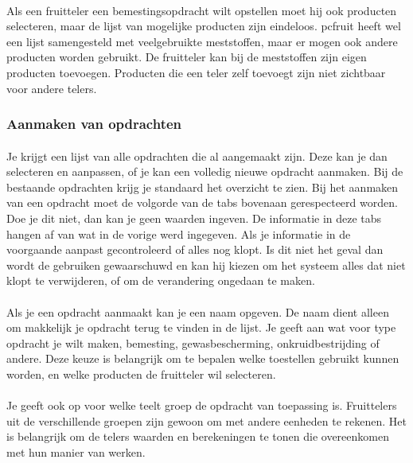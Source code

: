 \paragraph {} Als een fruitteler een bemestingsopdracht wilt opstellen moet hij ook
producten selecteren, maar de lijst van mogelijke producten zijn eindeloos. pcfruit heeft
wel een lijst samengesteld met veelgebruikte meststoffen, maar er mogen ook andere
producten worden gebruikt. De fruitteler kan bij de meststoffen zijn eigen producten
toevoegen. Producten die een teler zelf toevoegt zijn niet zichtbaar voor andere telers.


\subsubsection {Aanmaken van opdrachten}\label{aanmaken_opdrachten}

\paragraph {} Je krijgt een lijst van alle opdrachten die al aangemaakt zijn. Deze kan je
dan selecteren en aanpassen, of je kan een volledig nieuwe opdracht aanmaken. Bij de
bestaande opdrachten krijg je standaard het overzicht te zien. Bij het aanmaken van een
opdracht moet de volgorde van de tabs bovenaan gerespecteerd worden. Doe je dit niet, dan
kan je geen waarden ingeven. De informatie in deze tabs hangen af van wat in de vorige
werd ingegeven. Als je informatie in de voorgaande aanpast gecontroleerd of alles nog
klopt. Is dit niet het geval dan wordt de gebruiken gewaarschuwd en kan hij kiezen om het
systeem alles dat niet klopt te verwijderen, of om de verandering ongedaan te maken.

\paragraph {} Als je een opdracht aanmaakt kan je een naam opgeven. De naam dient alleen
om makkelijk je opdracht terug te vinden in de lijst. Je geeft aan wat voor type opdracht
je wilt maken, bemesting, gewasbescherming, onkruidbestrijding of andere. Deze keuze is
belangrijk om te bepalen welke toestellen gebruikt kunnen worden, en welke producten de
fruitteler wil selecteren.

\paragraph {} Je geeft ook op voor welke teelt groep de opdracht van toepassing is.
Fruittelers uit de verschillende groepen zijn gewoon om met andere eenheden te rekenen.
Het is belangrijk om de telers waarden en berekeningen te tonen die overeenkomen met hun
manier van werken.

